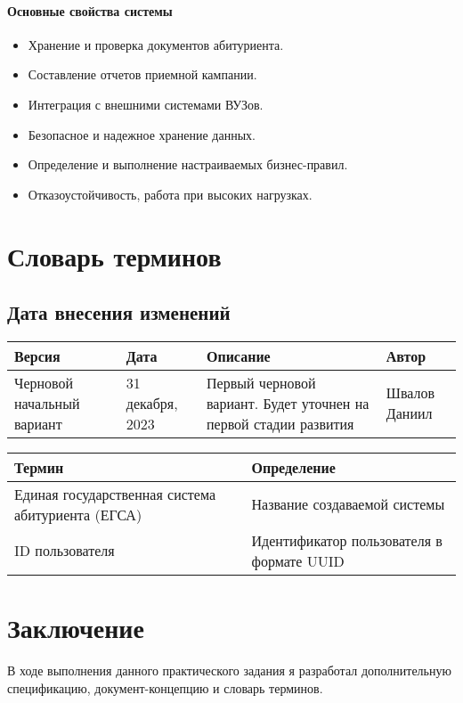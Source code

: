 \documentclass[a4paper, 14pt]{extarticle}
\begin{document}
\paragraph*{Основные свойства системы}

\begin{itemize}[leftmargin=*]
  \item Хранение и проверка документов абитуриента.
  \item Составление отчетов приемной кампании.
  \item Интеграция с внешними системами ВУЗов.
  \item Безопасное и надежное хранение данных.
  \item Определение и выполнение настраиваемых бизнес-правил.
  \item Отказоустойчивость, работа при высоких нагрузках.
\end{itemize}

\newpage

\section{Словарь терминов}

\subsection*{Дата внесения изменений}

\begin{table}[H]
  \begin{tabular}{|L{0.17\textwidth}|L{0.19\textwidth}|L{0.4\textwidth}|L{0.15\textwidth}|}
    \hline
    \textbf{Версия}                                                  &
    \textbf{Дата}                                                    &
    \textbf{Описание}                                                &
    \textbf{Автор}                                                     \\
    \hline
    Черновой начальный вариант                                       &
    31 декабря, 2023                                                 &
    Первый черновой вариант. Будет уточнен на первой стадии развития &
    Швалов Даниил                                                      \\
    \hline
  \end{tabular}
\end{table}

\begin{longtable}{|L{0.26\textwidth}|L{0.69\textwidth}|}
  \hline
  \textbf{Термин}                                   &
  \textbf{Определение}                                \\
  \hline
  Единая государственная система абитуриента (ЕГСА) &
  Название создаваемой системы                        \\
  \hline
  ID пользователя                                   &
  Идентификатор пользователя в формате UUID           \\
  \hline
\end{longtable}

\section{Заключение}

В ходе выполнения данного практического задания я разработал дополнительную
спецификацию, документ-концепцию и словарь терминов.
\end{document}
